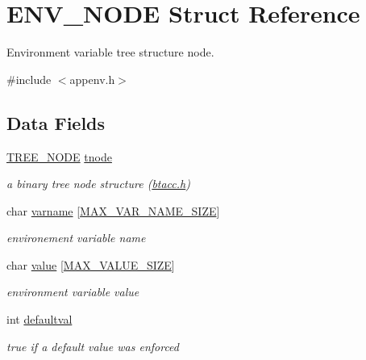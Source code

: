 \hypertarget{struct_e_n_v___n_o_d_e}{\section{E\-N\-V\-\_\-\-N\-O\-D\-E Struct Reference}
\label{struct_e_n_v___n_o_d_e}
}


Environment variable tree structure node.  




{\ttfamily \#include $<$appenv.\-h$>$}

\subsection*{Data Fields}
\begin{DoxyCompactItemize}
\item 
\hyperlink{btacc_8h_a401cf184fc63368a8957143cbb772739}{T\-R\-E\-E\-\_\-\-N\-O\-D\-E} \hyperlink{struct_e_n_v___n_o_d_e_a868f3bf6a758b3a4f5d07a72237d44c8}{tnode}
\begin{DoxyCompactList}\small\item\em a binary tree node structure (\hyperlink{btacc_8h}{btacc.\-h}) \end{DoxyCompactList}\item 
char \hyperlink{struct_e_n_v___n_o_d_e_a24342c6b5081fe1693576c6853e11fbe}{varname} \mbox{[}\hyperlink{appenv_8h_ab5aee3f0ef41f525f741904dd334f3a9}{M\-A\-X\-\_\-\-V\-A\-R\-\_\-\-N\-A\-M\-E\-\_\-\-S\-I\-Z\-E}\mbox{]}
\begin{DoxyCompactList}\small\item\em environement variable name \end{DoxyCompactList}\item 
char \hyperlink{struct_e_n_v___n_o_d_e_a46d06749d2c33796cffe83de819ebeea}{value} \mbox{[}\hyperlink{appenv_8h_a3cbe8667aff6d42a70de59c7c557727c}{M\-A\-X\-\_\-\-V\-A\-L\-U\-E\-\_\-\-S\-I\-Z\-E}\mbox{]}
\begin{DoxyCompactList}\small\item\em environment variable value \end{DoxyCompactList}\item 
int \hyperlink{struct_e_n_v___n_o_d_e_aa9f01a4b3b28015d5f847a3bd7b5885c}{defaultval}
\begin{DoxyCompactList}\small\item\em true if a default value was enforced \end{DoxyCompactList}\end{DoxyCompactItemize}


